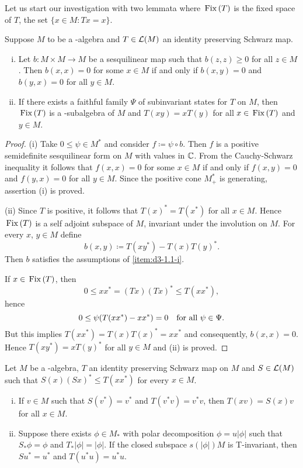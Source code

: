 Let us start our investigation with two lemmata where $ \mathop{}\mathrm{Fix}\left(T\right) $ is the fixed space of $T$, \ie the set $ \{x\in M \colon Tx=x \}$.
\begin{lemma}\label{lem:d3-1.1}
Suppose $M$ to be a \CA-algebra and $ T \in \mathcal{L}(M) $ an identity preserving Schwarz map.
\begin{enumerate}[(i)]

\item\label{item:d3-1.1-i}
Let $ b \colon M \times M \to M $ be a sesquilinear map such that $ b(z,z) \geq 0 $ for all $ z \in M $.
Then $ b(x,x) = 0 $ for some $x\in M$ if and only if $b(x,y) = 0$ and $b(y,x) = 0$ for all $y\in M$.

\item\label{item:d3-1.1-ii}
If there exists a faithful family $\Psi$ of subinvariant states for $T$ on $M$, then $\mathop{}\mathrm{Fix}\left(T\right)$ is a \CA-subalgebra of $M$ and $T(xy) = xT(y)$ for all $ x \in \mathop{}\mathrm{Fix}\left(T\right) $ and $ y \in M $.

\end{enumerate}
\end{lemma}
\begin{proof} 
(i) Take $0 \leq \psi \in M^{*}$ and consider $f \coloneqq \psi\circ b$.
Then $f$ is a positive semidefinite sesquilinear form on $M$ with values in $\mathbb{C}$.
From the Cauchy-Schwarz inequality it follows that $f(x,x) = 0$ for some $x\in M$ if and only if $f(x,y) = 0$ and $f(y,x) = 0$ for all $y\in M$.
Since the positive cone $M^{*}_{+}$ is generating, assertion (i) is proved.

(ii) Since $T$ is positive,  it follows that $T(x)^{*} = T(x^{*})$ for all $x \in M$.
Hence $\mathop{}\mathrm{Fix}\left(T\right)$ is a self adjoint subspace of $M$, \ie invariant under the involution on $M$.
For every $x$, $ y \in M $ define
\[
	b(x,y) \coloneqq T(xy^{*}) - T(x)T(y)^{*}.
\]
Then $b$ satisfies the assumptions of \ref{item:d3-1.1-i}.

If $x\in\mathop{}\mathrm{Fix}\left(T\right)$, then
\[
0 \leq xx^{*} = (Tx)(Tx)^{*} \leq T(xx^{*}),
\]
hence
\[
0 \leq \psi(T(xx^{*}) - xx^{*}) = 0 \quad \text{for all $ \psi\in\Psi $.} 
\]
But this implies $T(xx^{*}) = T(x)T(x)^{*} = xx^{*}$ and consequently, $b(x,x) = 0$.
Hence $T(xy^{*}) = xT(y)^{*}$ for all $y\in M$ and (ii) is proved.
\end{proof}
\begin{lemma}\label{lem:d3-1.2}
Let $M$ be a \WA-algebra, $T$ an identity preserving Schwarz map on $M$ and $S\in\mathcal{L}(M)$ such that $S(x)(Sx)^{*} \leq T(xx^{*})$ for every $x\in M$.
\begin{enumerate}[(i)]

\item\label{item:d3-1.2-i}
If $v\in M$ such that $S(v^{*}) = v^{*}$ and $T(v^{*}v) = v^{*}v$, then $T(xv) = S(x)v$ for all $x\in M$.

\item\label{item:d3-1.2-ii}
Suppose there exists $\phi\in M_{*}$ with polar decomposition $\phi = u|\phi|$ such that $S_{*}\phi = \phi$ and $T_{*}|\phi| = |\phi|$.
If the closed subspace $s(|\phi|)M$ is T-invariant, then $Su^{*} = u^{*}$ and $T(u^{*}u) = u^{*}u$.
\end{enumerate}
\end{lemma}
